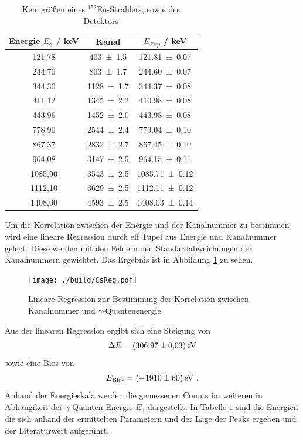 \begin{table}[H]
  \centering
  \caption{Kenngrößen eines $^{152}$Eu-Strahlers, sowie des Detektors}
  \begin{tabular}{c | c c }
    \toprule
    Energie $E_{\gamma}$ / keV \cite{V18}& Kanal & $E_{Exp}$ / keV \\
    \hline
    121,78  & \num{403 +- 1,5}	& \num{121,81 +- 0,07}	\\
    244,70  & \num{803 +- 1,7}  & \num{244,60 +- 0,07}	\\
    344,30  & \num{1128+- 1,7}	& \num{344,37 +- 0,08}	\\
    411,12  & \num{1345+- 2,2}	& \num{410,98 +- 0,08}	\\
    443,96  & \num{1452+- 2,0}	& \num{443,98 +- 0,08}	\\
    778,90  & \num{2544+- 2,4}	& \num{779,04 +- 0,10}	\\
    867,37  & \num{2832+- 2,7}	& \num{867,45 +- 0,10}	\\
    964,08  & \num{3147+- 2,5}	& \num{964,15 +- 0,11}	\\
    1085,90 & \num{3543+- 2,5}	& \num{1085,71 +- 0,12}	\\
    1112,10 & \num{3629+- 2,5}	& \num{1112,11 +- 0,12}	\\
    1408,00 & \num{4593+- 2,5}	& \num{1408,03 +- 0,14}	\\
    \bottomrule
  \end{tabular}
  \label{tab:CsSpekt}
\end{table}

Um die Korrelation zwischen der Energie und der Kanalnummer zu bestimmen wird eine lineare Regression durch elf Tupel aus Energie und Kanalnummer gelegt. Diese werden mit den Fehlern den Standardabweichungen der Kanalnummern gewichtet. Das Ergebnis ist in Abbildung \ref{fig:RegEu} zu sehen.

\begin{figure}[H]
  \centering
  \texttt{[image: ./build/CsReg.pdf]}
  \caption{Lineare Regression zur Bestimmung der Korrelation zwischen Kanalnummer und $\gamma$-Quantenenergie}
  \label{fig:RegEu}
\end{figure}

Aus der linearen Regression ergibt sich eine Steigung von
\begin{equation}
  \Delta E = (\num{306,97 +- 0,03}) \, \text{eV}
  \label{eqn:Reg}
\end{equation}
sowie eine Bios von
\begin{equation}
  E_\text{Bios} = (\num{-1910 +- 60}) \, \text{eV} \ .
  \label{eqn:Bios}
\end{equation}
Anhand der Energieskala werden die gemessenen Counts im weiteren in Abhängikeit der $\gamma$-Quanten Energie $E_{\gamma}$ dargestellt. In Tabelle \ref{tab:CsSpekt} sind die Energien die sich anhand der ermittelten Parametern und der Lage der Peaks ergeben und der Literaturwert aufgeführt.



